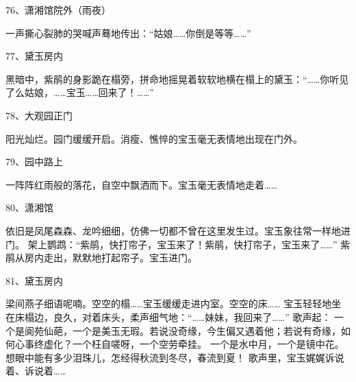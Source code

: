 76、潇湘馆院外（雨夜）\par
一声撕心裂肺的哭喊声蓦地传出：“姑娘……你倒是等等……”

77、黛玉房内\par
黑暗中，紫鹃的身影跪在榻旁，拼命地摇晃着软软地横在榻上的黛玉：“……你听见了么姑娘，……宝玉……回来了！……”

78、大观园正门\par 
阳光灿烂。园门缓缓开启。消瘦、憔悴的宝玉毫无表情地出现在门外。 

79、园中路上\par
一阵阵红雨般的落花，自空中飘洒而下。宝玉毫无表情地走着…… 

80、潇湘馆\par 
依旧是凤尾森森、龙吟细细，仿佛一切都不曾在这里发生过。宝玉象往常一样地进门。 
架上鹦鹉：“紫鹃，快打帘子，宝玉来了！紫鹃，快打帘子，宝玉来了……” 
紫鹃从房内走出，默默地打起帘子。宝玉进门。 

81、黛玉房内\par 
梁间燕子细语呢喃。空空的榻……宝玉缓缓走进内室。空空的床…… 
宝玉轻轻地坐在床榻边，良久，对着床头，柔声细气地：“……妹妹，我回来了……” 
歌声起： 
一个是阆苑仙葩，一个是美玉无瑕。若说没奇缘，今生偏又遇着他；若说有奇缘，如何心事终虚化？一个枉自嗟呀，一个空劳牵挂。
一个是水中月，一个是镜中花。想眼中能有多少泪珠儿，怎经得秋流到冬尽，春流到夏！
歌声里，宝玉娓娓诉说着、诉说着…… 